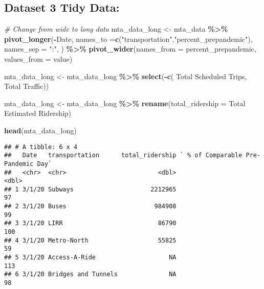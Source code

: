\documentclass[
]{article}
\newenvironment{Shaded}{\begin{snugshade}}{\end{snugshade}}
\newcommand{\AttributeTok}[1]{\textcolor[rgb]{0.13,0.29,0.53}{#1}}
\newcommand{\CommentTok}[1]{\textcolor[rgb]{0.56,0.35,0.01}{\textit{#1}}}
\newcommand{\FunctionTok}[1]{\textcolor[rgb]{0.13,0.29,0.53}{\textbf{#1}}}
\newcommand{\NormalTok}[1]{#1}
\newcommand{\OtherTok}[1]{\textcolor[rgb]{0.56,0.35,0.01}{#1}}
\newcommand{\SpecialCharTok}[1]{\textcolor[rgb]{0.81,0.36,0.00}{\textbf{#1}}}
\newcommand{\StringTok}[1]{\textcolor[rgb]{0.31,0.60,0.02}{#1}}
\begin{document}
\subsection{Dataset 3 Tidy Data:}\label{dataset-3-tidy-data}

\begin{Shaded}
\begin{Highlighting}[]
\CommentTok{\# Change from wide to long data }
\NormalTok{mta\_data\_long }\OtherTok{\textless{}{-}}\NormalTok{ mta\_data }\SpecialCharTok{\%\textgreater{}\%}
  \FunctionTok{pivot\_longer}\NormalTok{(}\SpecialCharTok{{-}}\NormalTok{Date, }\AttributeTok{names\_to =}\FunctionTok{c}\NormalTok{(}\StringTok{"transportation"}\NormalTok{,}\StringTok{"percent\_prepandemic"}\NormalTok{),}
               \AttributeTok{names\_sep =} \StringTok{":"}\NormalTok{, ) }\SpecialCharTok{\%\textgreater{}\%}
  \FunctionTok{pivot\_wider}\NormalTok{(}\AttributeTok{names\_from =}\NormalTok{ percent\_prepandemic, }\AttributeTok{values\_from =}\NormalTok{ value)}

\NormalTok{mta\_data\_long }\OtherTok{\textless{}{-}}\NormalTok{ mta\_data\_long }\SpecialCharTok{\%\textgreater{}\%}
  \FunctionTok{select}\NormalTok{(}\SpecialCharTok{{-}}\FunctionTok{c}\NormalTok{(}\StringTok{\textasciigrave{}}\AttributeTok{ Total Scheduled Trips}\StringTok{\textasciigrave{}}\NormalTok{, }\StringTok{\textasciigrave{}}\AttributeTok{ Total Traffic}\StringTok{\textasciigrave{}}\NormalTok{))}

\NormalTok{mta\_data\_long }\OtherTok{\textless{}{-}}\NormalTok{ mta\_data\_long }\SpecialCharTok{\%\textgreater{}\%}
  \FunctionTok{rename}\NormalTok{(}\AttributeTok{total\_ridership =} \StringTok{\textasciigrave{}}\AttributeTok{ Total Estimated Ridership}\StringTok{\textasciigrave{}}\NormalTok{)}

\FunctionTok{head}\NormalTok{(mta\_data\_long)}
\end{Highlighting}
\end{Shaded}

\begin{verbatim}
## # A tibble: 6 x 4
##   Date   transportation      total_ridership ` % of Comparable Pre-Pandemic Day`
##   <chr>  <chr>                         <dbl>                               <dbl>
## 1 3/1/20 Subways                     2212965                                  97
## 2 3/1/20 Buses                        984908                                  99
## 3 3/1/20 LIRR                          86790                                 100
## 4 3/1/20 Metro-North                   55825                                  59
## 5 3/1/20 Access-A-Ride                    NA                                 113
## 6 3/1/20 Bridges and Tunnels              NA                                  98
\end{verbatim}
\end{document}
